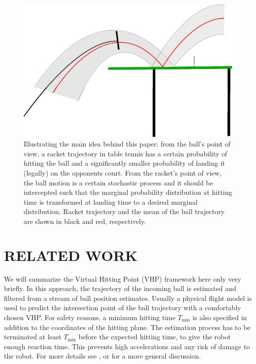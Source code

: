\documentclass[letterpaper, 10 pt, conference]{ieeeconf}
\begin{document}
\begin{figure}[t!]
\centering
\includegraphics[scale=0.4]{drawing.eps}			
\caption{Illustrating the main idea behind this paper: from the ball's point of view, a racket trajectory in table tennis has a certain probability of hitting the ball and a significantly smaller probability of landing it (legally) on the opponents court. From the racket's point of view, the ball motion is a certain stochastic process and it should be intercepted such that the marginal probability distribution at hitting time is transformed at landing time to a desired marginal distribution. Racket trajectory and the mean of the ball trajectory are shown in black and red, respectively.}
\label{mainIdea}
\end{figure}

\section{RELATED WORK}\label{relatedWork}

We will summarize the Virtual Hitting Point (VHP) framework here only very briefly. In this approach, the trajectory of the incoming ball is estimated and filtered from a stream of ball position estimates. Usually a physical flight model is used to predict the intersection point of the ball trajectory with a comfortably chosen VHP. For safety reasons, a minimum hitting time $T_{\textrm{min}}$ is also specified in addition to the coordinates of the hitting plane. The estimation process has to be terminated at least $T_{\textrm{min}}$ before the expected hitting time, to give the robot enough reaction time. This prevents high accelerations and any risk of damage to the robot. For more details see \cite{Muelling13}, or \cite{Matsushima05} for a more general discussion. 
\end{document}
